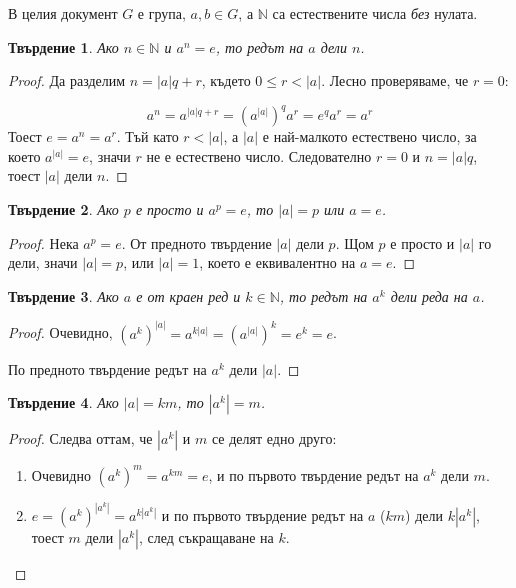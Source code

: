 \documentclass{article}
\newtheorem{prop}{Твърдение}
\theoremstyle{definition}
\newcommand{\ord}[1]{|#1|}
\begin{document}
В целия документ $G$ е група, $a,b \in G$, а $\mathbb N$ са естествените числа \textit{без} нулата.

\begin{prop}
    Ако $n \in \mathbb N$ и $a^n = e$, то редът на $a$ дели $n$.
\end{prop}

\begin{proof}
    Да разделим $n = \ord a q + r$, където $0 \le r < \ord a$. Лесно проверяваме, че $r = 0$:

    $$a^n = a^{\ord a q + r} = (a^{\ord a})^q a^r = e^q a^r = a^r$$
    Тоест $e = a^n = a^r$.
    Тъй като $r < \ord a$, а $\ord a$ е най-малкото естествено число,
    за което $a^{\ord a} = e$, значи $r$ не е естествено число.
    Следователно $r = 0$ и $n = \ord a q$, тоест $\ord a$ дели $n$.
\end{proof}

\begin{prop}
    Ако $p$ е просто и $a^p = e$, то $\ord a = p$ или $a = e$.
\end{prop}

\begin{proof}
    Нека $a^p = e$.
От предното твърдение $\ord a$ дели $p$. Щом $p$ е просто и $\ord a$ го дели, значи $\ord a = p$, или $\ord a = 1$, което е еквивалентно на $a = e$.
\end{proof}

\begin{prop}
    Ако $a$ е от краен ред и $k \in \mathbb{N}$, то редът на $a^k$ дели реда на $a$.
\end{prop}

\begin{proof}
    Очевидно, $(a^k)^{\ord a} = a^{k \ord a} = (a^{\ord a})^k = e^k = e$.

    По предното твърдение редът на $a^k$ дели $\ord a$.

    \iffalse
    \fi
\end{proof}

\begin{prop}
    Ако $\ord a = km$, то $\ord {a^k} = m$.
\end{prop}
\begin{proof}
    Следва оттам, че $\ord {a^k}$ и $m$ се делят едно друго:
    \begin{enumerate}
        \item Очевидно $(a^k)^m = a^{km} = e$, и по първото твърдение редът на $a^k$ дели $m$.
        \item $e = (a^k)^{\ord {a^k}} = a^{k \ord {a^k}}$ и по първото твърдение редът на $a$ ($km$) дели $k \ord{a^k}$, тоест $m$ дели $\ord {a^k}$, след съкращаване на $k$.
    \end{enumerate}
\end{proof}
\end{document}
